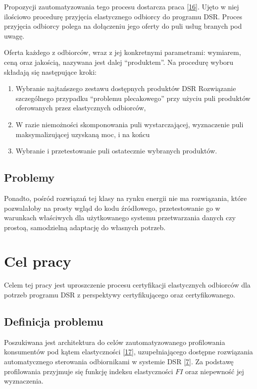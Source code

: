 Propozycji zautomatyzowania tego procesu dostarcza praca
{[}\protect\hyperlink{ref-klos_market_2018}{16}{]}. Ujęto w niej
ilościowo procedurę przyjęcia elastycznego odbiorcy do programu DSR.
Proces przyjęcia odbiorcy polega na dołączeniu jego oferty do puli usług
branych pod uwagę.

Oferta każdego z odbiorców, wraz z jej konkretnymi parametrami:
wymiarem, ceną oraz jakością, nazywana jest dalej ``produktem''. Na
procedurę wyboru składają się następujące kroki:

\begin{enumerate}
\def\labelenumi{\arabic{enumi}.}
\tightlist
\item
  Wybranie najtańszego zestawu dostępnych produktów DSR Rozwiązanie
  szczególnego przypadku ``problemu plecakowego'' przy użyciu puli
  produktów oferowanych przez elastycznych odbiorców,
\item
  W razie niemożności skomponowania puli wystarczającej, wyznaczenie
  puli maksymalizującej uzyskaną moc, i na końcu
\item
  Wybranie i przetestowanie puli ostatecznie wybranych produktów.
\end{enumerate}

\hypertarget{problemy-1}{%
\section{Problemy}\label{problemy-1}}

Ponadto, pośród rozwiązań tej klasy na rynku energii nie ma rozwiązania,
które pozwalałoby na prosty wgląd do kodu źródłowego, przetestowanie go
w warunkach właściwych dla użytkowanego systemu przetwarzania danych czy
prostoą, samodzielną adaptację do własnych potrzeb.

\hypertarget{cel-pracy}{%
\chapter{Cel pracy}\label{cel-pracy}}

Celem tej pracy jest uproszczenie procesu certyfikacji elastycznych
odbiorców dla potrzeb programu DSR z perspektywy certyfikującego oraz
certyfikowanego.

\hypertarget{definicja-problemu}{%
\section{Definicja problemu}\label{definicja-problemu}}

Poszukiwana jest architektura do celów zautomatyzowanego profilowania
konsumentów pod kątem elastyczności
{[}\protect\hyperlink{ref-alahakoon_smart_2016}{17}{]}, uzupełniającego
dostępne rozwiązania automatycznego sterowania odbiornikami w systemie
DSR {[}\protect\hyperlink{ref-curtis_demand_2018}{7}{]}. Za podstawę
profilowania przyjmuje się funkcję indeksu elastyczności \(FI\) oraz
niepewność jej wyznaczenia.

